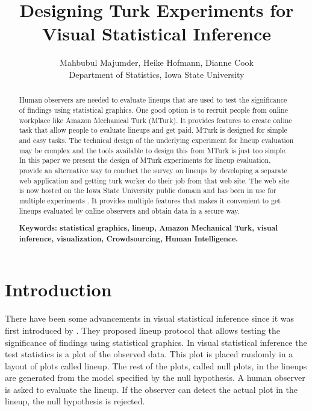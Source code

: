 \documentclass[11pt]{article}
\title{Designing Turk Experiments for Visual Statistical Inference}
\author{Mahbubul Majumder, Heike Hofmann, Dianne Cook\\
        Department of Statistics, Iowa State University}
\begin{document}
\tableofcontents

\maketitle


\begin {abstract} 

Human observers are needed to evaluate lineups that are used to test the significance of findings using statistical graphics. One good option is to recruit people from online workplace like Amazon Mechanical Turk (MTurk). It provides features to create online task that allow people to evaluate lineups and get paid. MTurk is designed for simple and easy tasks. The technical design of the underlying experiment for lineup evaluation may be complex and the tools available to design this from MTurk is just too simple. In this paper we present the design of MTurk experiments for lineup evaluation, provide an alternative way to conduct the survey on lineups by developing a separate web application and getting turk worker do their job from that web site. The web site is now hosted on the Iowa State University public domain and has been in use for multiple experiments \citep{majumder:turk}. It provides multiple features that makes it convenient to get lineups evaluated by online observers and obtain data in a secure way.

{\bf Keywords: \sf statistical graphics, lineup, Amazon Mechanical Turk, visual inference, visualization, Crowdsourcing, Human Intelligence.}

\end {abstract}


\section{Introduction} 

There have been some advancements in visual statistical inference since it was first introduced by \cite{buja:2009}. They  proposed lineup protocol that allows testing the significance of findings using statistical graphics. In visual statistical inference the test statistics is a plot of the observed data. This plot is placed randomly in a layout of plots called lineup. The rest of the plots, called null plots, in the lineups are generated from the model specified by the null hypothesis. A human observer is asked to evaluate the lineup. If the observer can detect the actual plot in the lineup, the null hypothesis is rejected. 
\end{document}
